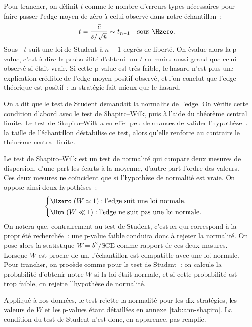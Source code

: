 Pour trancher, on définit \(t\) comme le nombre d'erreurs-types
nécessaires pour faire passer l'edge moyen de zéro à celui observé dans
notre échantillon~:
\[
  t = \frac{\bar e}{s/\sqrt{n}} \sim t_{n-1} \quad\text{sous } \Hzero .
\]
Sous \Hzero{}, \(t\) suit une loi de Student à \(n-1\) degrés de
liberté. On évalue alors la p-value, c'est-à-dire la probabilité
d'obtenir un \(t\) au moins aussi grand que celui observé si \Hzero{}
était vraie. Si cette p-value est très faible, le hasard n'est plus une
explication crédible de l'edge moyen positif observé, et l'on conclut
que l'edge théorique est positif~: la stratégie fait mieux que le
hasard.

On a dit que le test de Student demandait la normalité de l'edge. On
vérifie cette condition d'abord avec le test de Shapiro--Wilk, puis à
l'aide du théorème central limite. Le test de Shapiro--Wilk a en effet
peu de chances de valider l'hypothèse~: la taille de l'échantillon
déstabilise ce test, alors qu'elle renforce au contraire le théorème
central limite.


Le test de Shapiro--Wilk est un test de normalité qui compare deux
mesures de dispersion, d'une part les écarts à la moyenne, d'autre part
l'ordre des valeurs. Ces deux mesures ne coïncident que si l'hypothèse
de normalité est vraie. On oppose ainsi deux hypothèses~:
\[
  \begin{cases}
    \Hzero \;(W \simeq 1) : \text{l'edge suit une loi normale,}\\[2pt]
    \Hun \;(W \ll 1) : \text{l'edge ne suit pas une loi normale.}
  \end{cases}
\]
On notera que, contrairement au test de Student, c'est ici \Hzero{} qui
correspond à la propriété recherchée~: une p-value faible conduira donc
à rejeter la normalité. On pose alors la statistique
\(W = b^2/\mathrm{SCE}\) comme rapport de ces deux mesures. Lorsque
\(W\) est proche de un, l'échantillon est compatible avec une loi
normale. Pour trancher, on procède comme pour le test de Student~: on
calcule la probabilité d'obtenir notre \(W\) si la loi était normale, et
si cette probabilité est trop faible, on rejette l'hypothèse de
normalité.

Appliqué à nos données, le test rejette la normalité pour les dix
stratégies, les valeurs de \(W\) et les p-values étant détaillées en
annexe~\ref{tab:ann-shapiro}. La condition du test de Student n'est
donc, en apparence, pas remplie.

